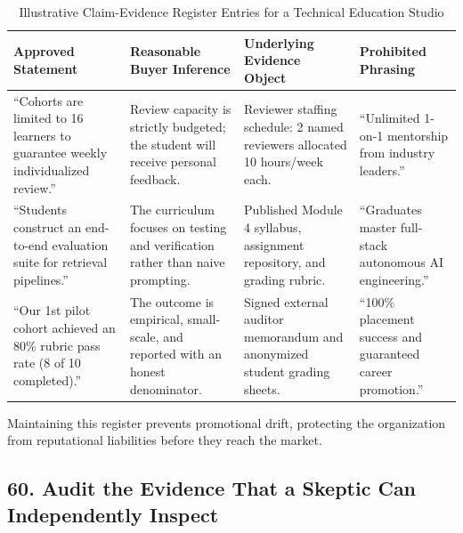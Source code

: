 \begin{table}[t]
\centering
\small
\caption{Illustrative Claim-Evidence Register Entries for a Technical Education Studio}
\label{tab:claim_register}
\begin{tabular}{p{3.8cm}p{3.8cm}p{3.8cm}p{3.8cm}}
\toprule
\textbf{Approved Statement} & \textbf{Reasonable Buyer Inference} & \textbf{Underlying Evidence Object} & \textbf{Prohibited Phrasing} \\
\midrule
``Cohorts are limited to 16 learners to guarantee weekly individualized review.'' & Review capacity is strictly budgeted; the student will receive personal feedback. & Reviewer staffing schedule: 2 named reviewers allocated 10 hours/week each. & ``Unlimited 1-on-1 mentorship from industry leaders.'' \\
\addlinespace
``Students construct an end-to-end evaluation suite for retrieval pipelines.'' & The curriculum focuses on testing and verification rather than naive prompting. & Published Module 4 syllabus, assignment repository, and grading rubric. & ``Graduates master full-stack autonomous AI engineering.'' \\
\addlinespace
``Our 1st pilot cohort achieved an 80\% rubric pass rate (8 of 10 completed).'' & The outcome is empirical, small-scale, and reported with an honest denominator. & Signed external auditor memorandum and anonymized student grading sheets. & ``100\% placement success and guaranteed career promotion.'' \\
\bottomrule
\end{tabular}
\end{table}

Maintaining this register prevents promotional drift, protecting the organization from reputational liabilities before they reach the market.

\subsection*{60. Audit the Evidence That a Skeptic Can Independently Inspect}

